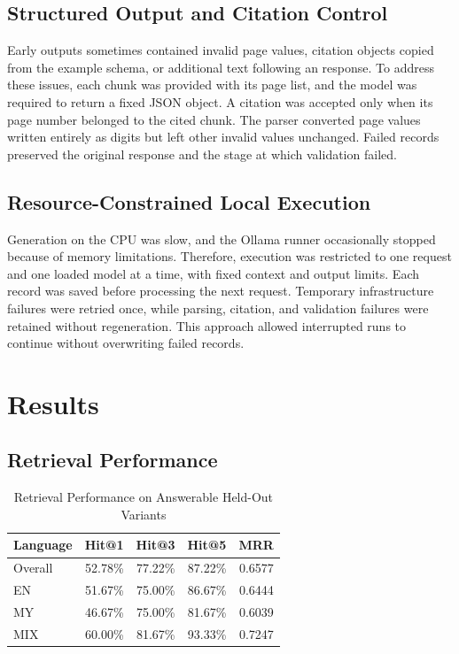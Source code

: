 \documentclass[a4paper,conference]{IEEEtran}
\newcommand{\code}[1]{\texttt{\detokenize{#1}}}
\begin{document}
\subsection{Structured Output and Citation Control}
Early outputs sometimes contained invalid page values, citation objects copied from the example schema, or additional text following an \code{ABSTAIN} response. To address these issues, each chunk was provided with its page list, and the model was required to return a fixed JSON object. A citation was accepted only when its page number belonged to the cited chunk. The parser converted page values written entirely as digits but left other invalid values unchanged. Failed records preserved the original response and the stage at which validation failed.

\subsection{Resource-Constrained Local Execution}
Generation on the CPU was slow, and the Ollama runner occasionally stopped because of memory limitations. Therefore, execution was restricted to one request and one loaded model at a time, with fixed context and output limits. Each record was saved before processing the next request. Temporary infrastructure failures were retried once, while parsing, citation, and validation failures were retained without regeneration. This approach allowed interrupted runs to continue without overwriting failed records.

\section{Results}
\subsection{Retrieval Performance}
\begin{table}[t]
\caption{Retrieval Performance on Answerable Held-Out Variants}
\label{tab:retrieval}
\centering
\footnotesize
\begin{tabular}{|l|r|r|r|r|}
\hline
Language & Hit@1 & Hit@3 & Hit@5 & MRR \\
\hline
Overall & 52.78\% & 77.22\% & 87.22\% & 0.6577 \\
\hline
EN      & 51.67\% & 75.00\% & 86.67\% & 0.6444 \\
\hline
MY      & 46.67\% & 75.00\% & 81.67\% & 0.6039 \\
\hline
MIX     & 60.00\% & 81.67\% & 93.33\% & 0.7247 \\
\hline
\end{tabular}
\end{table}
\end{document}

